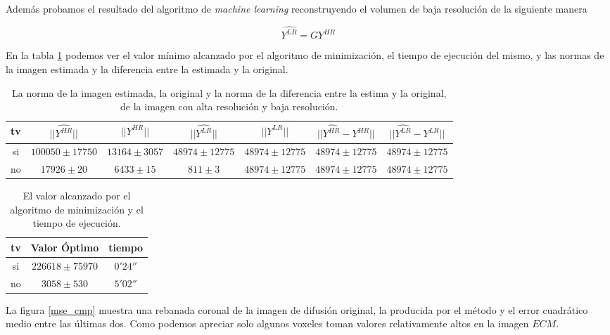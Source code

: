 \documentclass[a4paper,10pt]{article}%
\begin{document}
Además probamos el resultado del algoritmo de \textit{machine learning} reconstruyendo el 
volumen de baja resolución de la siguiente manera

$$\widehat{Y^{LR}} = GY^{HR}$$

En la tabla \ref{tab:res} podemos ver el valor mínimo alcanzado por el algoritmo de minimización, el 
tiempo de ejecución del mismo, y las normas de la imagen estimada y la diferencia entre la estimada 
y la original. 




\begin{table}[H]
\centering
\begin{tabular}{ |c|c|c|c|c|c|c| }
 \hline
 tv & $||\widehat{Y^{HR}}||$ & $||Y^{HR}||$& $||\widehat{Y^{LR}}||$ &$||Y^{LR}||$ & $||\widehat{Y^{HR}}-Y^{HR}||$& 
$||\widehat{Y^{LR}}-Y^{LR}||$\\
 \hline 
 si & $100050\pm17750$ & $13164\pm3057$  & $48974\pm12775$ & $48974\pm12775$ & 
$48974\pm12775$ & $48974\pm12775$ \\
 no & $17926\pm20$ & $6433\pm15$ & $811\pm3$ & $48974\pm12775$ & $48974\pm12775$  & 
$48974\pm12775$\\
 \hline
\end{tabular}

\caption{La norma de la imagen estimada, la original y la norma de la diferencia entre la estima y la original, de la 
imagen con alta resolución y baja resolución.}
\label{tab:res}
\end{table}


\begin{table}[H]
\centering
\begin{tabular}{ |c|c|c| }
 \hline
 tv & Valor Óptimo & tiempo \\
 \hline 
 si &$226618\pm75970$  & $0'24''$  \\
 no &$3058\pm530$  & $5'02''$  \\
 \hline
\end{tabular}

\caption{El valor alcanzado por el algoritmo de minimización y  el tiempo de ejecución.}
\label{tab:res_time}
\end{table}

La figura \ref{mse_cmp} muestra una rebanada coronal de la imagen de difusión original, la producida 
por el m\'etodo y el error cuadrático medio entre las \'ultimas dos. Como 
podemos apreciar solo algunos voxeles toman valores relativamente altos en la 
imagen $ECM$.
\end{document}
